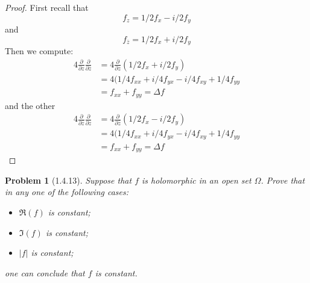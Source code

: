 \documentclass[10pt]{article}
\newcommand{\sk}{\vskip 10mm}
\newcommand{\conj}[1]{\overline{#1}}
\theoremstyle{plain}
\newtheorem{problem}{Problem}
\theoremstyle{remark}
\begin{document}
\begin{proof}
  First recall that
  \[
    f_z=1/2f_x-i/2f_y
  \]
  and
  \[
    f_{\conj{z}}=1/2f_x+i/2f_y
  \]
  Then we compute:
  \begin{align*}
    4\frac{\partial}{\partial z}\frac{\partial}{\partial\conj{z}} &= 4\frac{\partial}{\partial z}(1/2f_x+i/2f_y)\\
                                                           &= 4(1/4f_{xx}+i/4f_{yx}-i/4f_{xy}+1/4f_{yy}\\
                                                           &= f_{xx}+f_{yy} = \Delta f
  \end{align*}
  and the other
  \begin{align*}
    4\frac{\partial}{\partial \conj{z}}\frac{\partial}{\partial z} &= 4\frac{\partial}{\partial \conj{z}}(1/2f_x-i/2f_y)\\
                                                           &= 4(1/4f_{xx}+i/4f_{yx}-i/4f_{xy}+1/4f_{yy}\\
                                                           &= f_{xx}+f_{yy} = \Delta f
  \end{align*}
\end{proof}

\sk

\begin{problem}[1.4.13]
  Suppose that $f$ is holomorphic in an open set $\Omega$. Prove that in any one
  of the following cases:
  \begin{itemize}
  \item[(a)] $\Re(f)$ is constant;
  \item[(b)] $\Im(f)$ is constant;
  \item[(c)] $|f|$ is constant;
  \end{itemize}
  one can conclude that $f$ is constant.
\end{problem}
\end{document}
